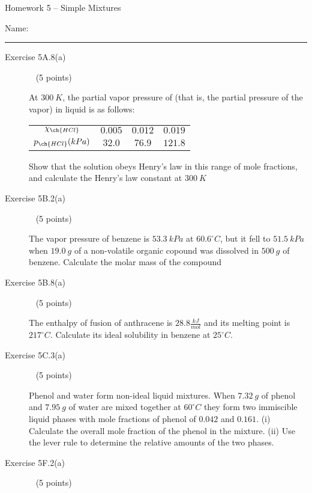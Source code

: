 \documentclass[12pt, openany, letterpaper]{memoir}
\begin{document}
\begin{center}
	{\large Homework 5 -- Simple Mixtures}
	
\end{center}

Name: \rule[-.1mm]{15em}{0.1pt}

\begin{description}	
	\item [Exercise 5A.8(a)] ~ (5 points)
	
	At $300~K$, the partial vapor pressure of  (that is, the partial pressure of the  vapor) in liquid  is as follows:
	
	\begin{tabular}{c|c|c|c}
		$\chi_{\ch{HCl}}$	& 	$0.005$	&	$0.012$	&	$0.019$\\
		$p_{\ch{HCl}}(kPa)$	&	$32.0$	&	$76.9$	&	$121.8$
	\end{tabular}

	Show that the solution obeys Henry's law in this range of mole fractions, and calculate the Henry's law constant at $300~K$
	
	\vspace{15em}
	\item [Exercise 5B.2(a)] ~ (5 points)
	
	The vapor pressure of benzene is $53.3~kPa$ at $60.6^\circ C$, but it fell to $51.5~kPa$ when $19.0~g$ of a non-volatile organic copound was dissolved in $500~g$ of benzene. Calculate the molar mass of the compound

	
	\vspace{25em}
	\item [Exercise 5B.8(a)] ~ (5 points)
	
	The enthalpy of fusion of anthracene is $28.8\frac{kJ}{mol}$ and its melting point is $217^\circ C$. Calculate its ideal solubility in benzene at $25^\circ C$.
	
	\vspace{20em}
	\item [Exercise 5C.3(a)] ~ (5 points)
	
	Phenol and water form non-ideal liquid mixtures. When $7.32~g$ of phenol and $7.95~g$ of water are mixed together at $60^\circ C$ they form two immiscible liquid phases with mole fractions of phenol of $0.042$  and $0.161$. (i) Calculate the overall mole fraction of the phenol in the mixture. (ii) Use the lever rule to determine the relative amounts of the two phases.
	
	\vspace{25em}
	\item [Exercise 5F.2(a)] ~ (5 points)
	

\end{description}
\end{document}
